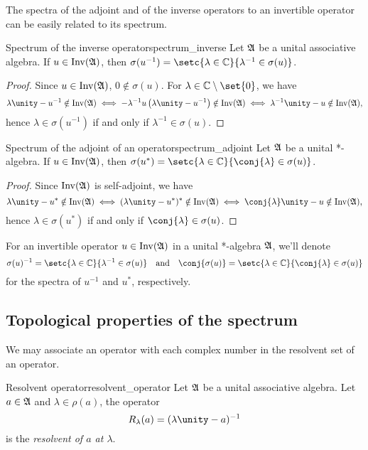 The spectra of the adjoint and of the inverse operators to an invertible operator can be easily related to its spectrum.
\begin{proposition}{Spectrum of the inverse operator}{spectrum_inverse}
    Let \(\mathfrak{A}\) be a unital associative algebra. If \(u \in \operatorname{Inv}(\mathfrak{A})\), then \(\sigma(u^{-1}) = \setc{\lambda \in \mathbb{C}}{\lambda^{-1} \in \sigma(u)}\).
\end{proposition}
\begin{proof}
    Since \(u \in \operatorname{Inv}(\mathfrak{A})\), \(0 \notin \sigma(u)\). For \(\lambda \in \mathbb{C} \setminus \set{0}\), we have
    \begin{equation*}
        \lambda \unity - u^{-1} \notin \invertible{\algebra{A}} \iff -\lambda^{-1} u \left(\lambda \unity - u^{-1}\right) \notin \invertible{\algebra{A}} \iff \lambda^{-1}\unity - u \notin \invertible{\algebra{A}},
    \end{equation*}
    hence \(\lambda \in \sigma(u^{-1})\) if and only if \(\lambda^{-1} \in \sigma(u)\).
\end{proof}
\begin{proposition}{Spectrum of the adjoint of an operator}{spectrum_adjoint}
    Let \(\mathfrak{A}\) be a unital *-algebra. If \(u \in \operatorname{Inv}(\mathfrak{A})\), then \(\sigma(u^*) = \setc{\lambda \in \mathbb{C}}{\conj{\lambda} \in \sigma(u)}\).
\end{proposition}
\begin{proof}
    Since \(\operatorname{Inv}(\mathfrak{A})\) is self-adjoint, we have
    \begin{equation*}
        \lambda \unity - u^* \notin \invertible{\algebra{A}} \iff (\lambda \unity - u^*)^* \notin \invertible{\algebra{A}} \iff \conj{\lambda}\unity - u \notin \invertible{\algebra{A}},
    \end{equation*}
    hence \(\lambda \in \sigma(u^*)\) if and only if \(\conj{\lambda} \in \sigma(u)\).
\end{proof}
For an invertible operator \(u \in \operatorname{Inv}(\mathfrak{A})\) in a unital *-algebra \(\mathfrak{A}\), we'll denote
\begin{equation*}
    \sigma(u)^{-1} = \setc{\lambda \in \mathbb{C}}{\lambda^{-1} \in \sigma(u)} \quad\text{and}\quad \conj{\sigma(u)} = \setc{\lambda \in \mathbb{C}}{\conj{\lambda} \in \sigma(u)}
\end{equation*}
for the spectra of \(u^{-1}\) and \(u^*\), respectively.

\subsection{Topological properties of the spectrum}
We may associate an operator with each complex number in the resolvent set of an operator.
\begin{definition}{Resolvent operator}{resolvent_operator}
    Let \(\mathfrak{A}\) be a unital associative algebra. Let \(a \in \mathfrak{A}\) and \(\lambda \in \rho(a)\), the operator
    \begin{equation*}
        R_\lambda(a) = (\lambda \unity - a)^{-1}
    \end{equation*}
    is the \emph{resolvent of \(a\) at \(\lambda\)}.
\end{definition}

